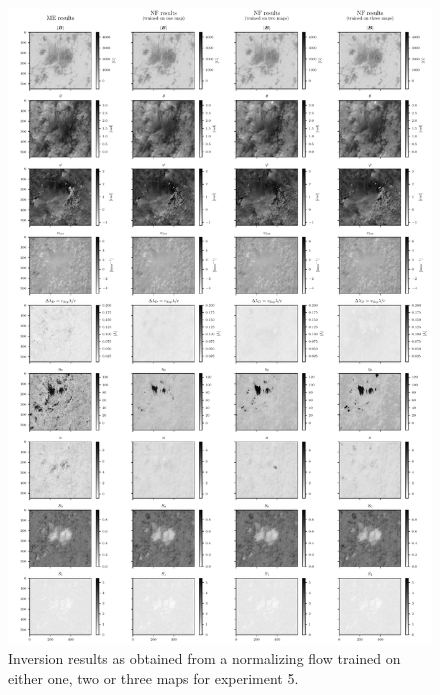 \documentclass[a4paper,12pt]{report}
\begin{document}
\begin{figure}[h]
\centering
\includegraphics[height=\textheight-1cm]{figures/nf-milne-eddington-example-5-nflows-piecewisequadratic-comp-ME-NF-map19.pdf}
\caption{Inversion results as obtained from a normalizing flow trained on either one, two or three maps for experiment 5.}
\label{fig:nf-milne-eddington-example-5-nflows-piecewisequadratic-comp-ME-NF-map19}
\end{figure}
\end{document}
